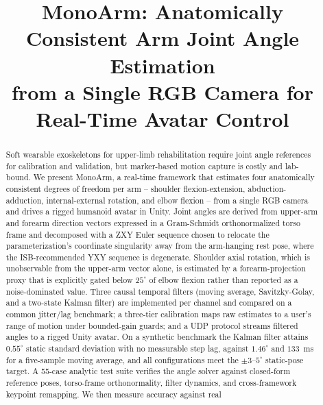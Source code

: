 \documentclass[conference]{IEEEtran}
\begin{document}
\title{MonoArm: Anatomically Consistent Arm Joint Angle Estimation\\
from a Single RGB Camera for Real-Time Avatar Control}

\author{
}

\maketitle

\begin{abstract}
Soft wearable exoskeletons for upper-limb rehabilitation require joint
angle references for calibration and validation, but marker-based motion
capture is costly and lab-bound. We present MonoArm, a real-time
framework that estimates four anatomically consistent degrees of freedom
per arm -- shoulder flexion-extension, abduction-adduction,
internal-external rotation, and elbow flexion -- from a single RGB camera
and drives a rigged humanoid avatar in Unity. Joint angles are derived
from upper-arm and forearm direction vectors expressed in a Gram-Schmidt
orthonormalized torso frame and decomposed with a ZXY Euler sequence
chosen to relocate the parameterization's coordinate singularity away
from the arm-hanging rest pose, where the ISB-recommended YXY sequence is
degenerate. Shoulder axial rotation, which is unobservable from the
upper-arm vector alone, is estimated by a forearm-projection proxy that
is explicitly gated below $25^\circ$ of elbow flexion rather than
reported as a noise-dominated value. Three causal temporal filters
(moving average, Savitzky-Golay, and a two-state Kalman filter) are
implemented per channel and compared on a common jitter/lag benchmark; a
three-tier calibration maps raw estimates to a user's range of motion
under bounded-gain guards; and a UDP protocol streams filtered angles to
a rigged Unity avatar. On a synthetic benchmark the Kalman filter attains
$0.55^\circ$ static standard deviation with no measurable step lag,
against $1.46^\circ$ and $133$~ms for a five-sample moving average, and
all configurations meet the $\pm3$--$5^\circ$ static-pose target. A
55-case analytic test suite verifies the angle solver against closed-form
reference poses, torso-frame orthonormality, filter dynamics, and
cross-framework keypoint remapping. We then measure accuracy against real

\end{abstract}
\end{document}
